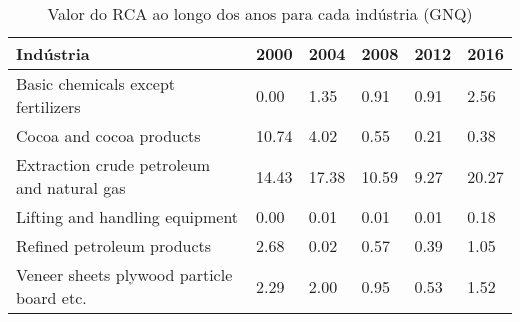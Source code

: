 \begin{table}
\centering
\caption{Valor do RCA ao longo dos anos para cada indústria (GNQ)}
\label{tab:ex3-tempo-GNQ}
\begin{tabular}{p{6cm}p{1.5cm}p{1.5cm}p{1.5cm}p{1.5cm}p{1.5cm}}
\toprule
                                 Indústria &  2000 &  2004 &  2008 & 2012 &  2016 \\
\midrule
        Basic chemicals except fertilizers &  0.00 &  1.35 &  0.91 & 0.91 &  2.56 \\
                  Cocoa and cocoa products & 10.74 &  4.02 &  0.55 & 0.21 &  0.38 \\
Extraction crude petroleum and natural gas & 14.43 & 17.38 & 10.59 & 9.27 & 20.27 \\
            Lifting and handling equipment &  0.00 &  0.01 &  0.01 & 0.01 &  0.18 \\
                Refined petroleum products &  2.68 &  0.02 &  0.57 & 0.39 &  1.05 \\
 Veneer sheets plywood particle board etc. &  2.29 &  2.00 &  0.95 & 0.53 &  1.52 \\
\bottomrule
\end{tabular}
\end{table}
